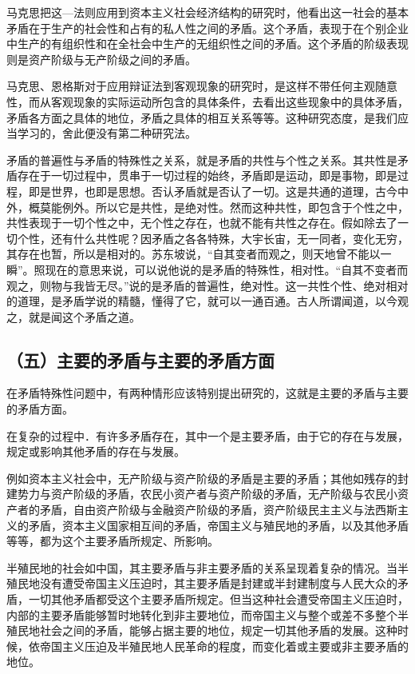 马克思把这—法则应用到资本主义社会经济结构的研究时，他看出这一社会的基本矛盾在于生产的社会性和占有的私人性之间的矛盾。这个矛盾，表现于在个别企业中生产的有组织性和在全社会中生产的无组织性之间的矛盾。这个矛盾的阶级表现则是资产阶级与无产阶级之间的矛盾。

马克思、恩格斯对于应用辩证法到客观现象的研究时，是这样不带任何主观随意性，而从客观现象的实际运动所包含的具体条件，去看出这些现象中的具体矛盾，矛盾各方面之具体的地位，矛盾之具体的相互关系等等。这种研究态度，是我们应当学习的，舍此便没有第二种研究法。

矛盾的普遍性与矛盾的特殊性之关系，就是矛盾的共性与个性之关系。其共性是矛盾存在于一切过程中，贯串于一切过程的始终，矛盾即是运动，即是事物，即是过程，即是世界，也即是思想。否认矛盾就是否认了一切。这是共通的道理，古今中外，概莫能例外。所以它是共性，是绝对性。然而这种共性，即包含于个性之中，共性表现于一切个性之中，无个性之存在，也就不能有共性之存在。假如除去了一切个性，还有什么共性呢？因矛盾之各各特殊，大宇长宙，无一同者，变化无穷，其存在也暂，所以是相对的。苏东坡说，“自其变者而观之，则天地曾不能以一瞬”。照现在的意思来说，可以说他说的是矛盾的特殊性，相对性。“自其不变者而观之，则物与我皆无尽。”说的是矛盾的普遍性，绝对性。这一共性个性、绝对相对的道理，是矛盾学说的精髓，懂得了它，就可以一通百通。古人所谓闻道，以今观之，就是闻这个矛盾之道。

\subsection{（五）主要的矛盾与主要的矛盾方面}

在矛盾特殊性问题中，有两种情形应该特别提出研究的，这就是主要的矛盾与主要的矛盾方面。

在复杂的过程中．有许多矛盾存在，其中一个是主要矛盾，由于它的存在与发展，规定或影响其他矛盾的存在与发展。

例如资本主义社会中，无产阶级与资产阶级的矛盾是主要的矛盾；其他如残存的封建势力与资产阶级的矛盾，农民小资产者与资产阶级的矛盾，无产阶级与农民小资产者的矛盾，自由资产阶级与金融资产阶级的矛盾，资产阶级民主主义与法西斯主义的矛盾，资本主义国家相互间的矛盾，帝国主义与殖民地的矛盾，以及其他矛盾等等，都为这个主要矛盾所规定、所影响。

半殖民地的社会如中国，其主要矛盾与非主要矛盾的关系呈现着复杂的情况。当半殖民地没有遭受帝国主义压迫时，其主要矛盾是封建或半封建制度与人民大众的矛盾，一切其他矛盾都受这个主要矛盾所规定。但当这种社会遭受帝国主义压迫时，内部的主要矛盾能够暂时地转化到非主要地位，而帝国主义与整个或差不多整个半殖民地社会之间的矛盾，能够占据主要的地位，规定一切其他矛盾的发展。这种时候，依帝国主义压迫及半殖民地人民革命的程度，而变化着或主要或非主要矛盾的地位。

